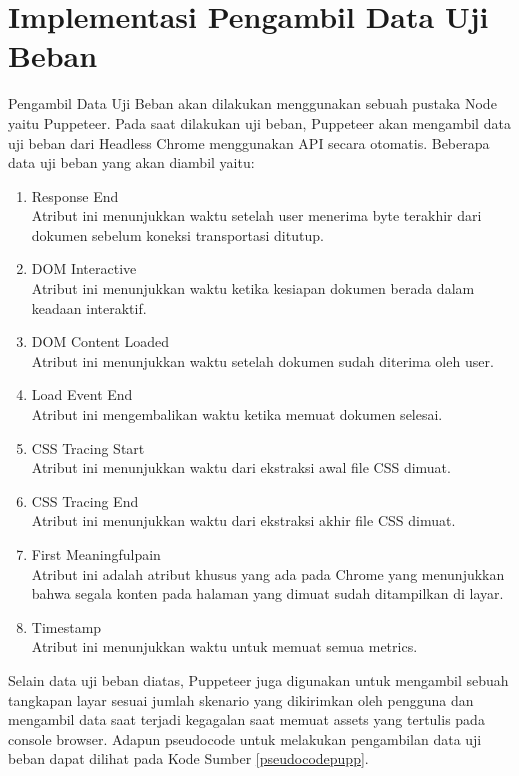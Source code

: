 	\section{Implementasi Pengambil Data Uji Beban}
		Pengambil Data Uji Beban akan dilakukan menggunakan sebuah pustaka Node yaitu Puppeteer. Pada saat dilakukan uji beban, Puppeteer akan mengambil data uji beban dari Headless Chrome menggunakan API secara otomatis. Beberapa data uji beban yang akan diambil yaitu:
		\begin{enumerate}
			\item Response End \\
				Atribut ini menunjukkan waktu setelah user menerima byte terakhir dari dokumen sebelum koneksi transportasi ditutup.
			\item DOM Interactive \\
				Atribut ini menunjukkan waktu ketika kesiapan dokumen berada dalam keadaan interaktif.
			\item DOM Content Loaded \\
				Atribut ini menunjukkan waktu setelah dokumen sudah diterima oleh user.
			\item Load Event End \\
				Atribut ini mengembalikan waktu ketika memuat dokumen selesai.
			\item CSS Tracing Start \\
				Atribut ini menunjukkan waktu dari ekstraksi awal file CSS dimuat.
			\item CSS Tracing End \\
				Atribut ini menunjukkan waktu dari ekstraksi akhir file CSS dimuat.
			\item First Meaningfulpain \\
				Atribut ini adalah atribut khusus yang ada pada Chrome yang menunjukkan bahwa segala konten pada halaman yang dimuat sudah ditampilkan di layar.
			\item Timestamp \\
				Atribut ini menunjukkan waktu untuk memuat semua metrics.
		\end{enumerate}
	 
	 	\indent Selain data uji beban diatas, Puppeteer juga digunakan untuk mengambil sebuah tangkapan layar sesuai jumlah skenario yang dikirimkan oleh pengguna dan mengambil data saat terjadi kegagalan saat memuat assets yang tertulis pada console browser. Adapun pseudocode untuk melakukan pengambilan data uji beban dapat dilihat pada Kode Sumber \ref{pseudocodepupp}.
	 	
